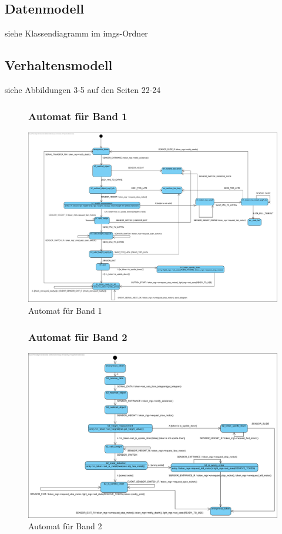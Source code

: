 \documentclass[oneside,a4paper,titlepage]{scrartcl} %
\begin{document}
\subsection{Datenmodell}
siehe Klassendiagramm im imgs-Ordner \newline

\subsection{Verhaltensmodell}
siehe Abbildungen 3-5 auf den Seiten 22-24

\begin{figure}
	\subsubsection{Automat für Band 1}
	\centering\vfill\includegraphics[angle=90,scale=0.54]{imgs/Band1_FSM.png}
    \caption{Automat für Band 1}
\end{figure}

\begin{figure}
	\subsubsection{Automat für Band 2}
	\centering\vfill\includegraphics[angle=90,scale=0.65]{imgs/Band2_FSM.png}
    \caption{Automat für Band 2}
    \clearpage
\end{figure}
\end{document}
